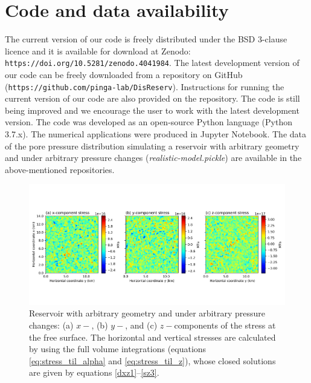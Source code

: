 \documentclass[P]{BrJG_submit}
\begin{document}
\section*{Code and data availability}
The current version of our code is freely distributed under the BSD 3-clause licence and it is available for download at Zenodo: \texttt{https://doi.org/10.5281/zenodo.4041984}. 
The latest development version of our code can be freely downloaded from a repository on GitHub (\texttt{https://github.com/pinga-lab/DisReserv}). 
Instructions for running  the current version of our code are also provided on the repository.
The code is still being improved and we encourage the user to work with the latest development version. 
The code was developed as an open-source Python language (Python 3.7.x).
The numerical applications were produced in Jupyter Notebook. 
The data of the pore pressure distribution simulating a reservoir with arbitrary geometry and under arbitrary pressure changes
(\textit{realistic-model.pickle}) are available  in the  above-mentioned repositories.

\begin{figure}[!t]
    \centering
    \includegraphics[width=\textwidth]{figures/Figure_Null_stress_complex_reservoir.png}
    \vspace{-2.0cm}
    \caption{Reservoir with arbitrary geometry and under arbitrary pressure changes: 
    (a) $x-$, (b) $y-$, and (c) $z-$components of the stress at the free surface.
	The horizontal and vertical stresses are calculated by using 
	the full volume integrations (equations \ref{eq:stress_til_alpha} and \ref{eq:stress_til_z}),
	whose closed solutions are given by equations \ref{dxz1}--\ref{sz3}.}
	\label{fig:Null_stress_complex_reservoir}
\end{figure}

 

%
\end{document}
